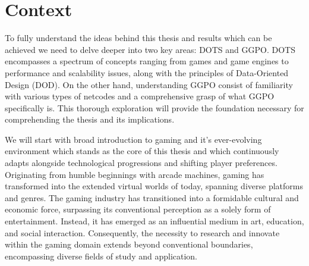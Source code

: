 \chapter{Context}

To fully understand the ideas behind this thesis and results which can be achieved we need to delve deeper into two key areas: DOTS and GGPO. DOTS encompasses a spectrum of concepts ranging from games and game engines to performance and scalability issues, along with the principles of Data-Oriented Design (DOD). On the other hand, understanding GGPO consist of familiarity with various types of netcodes and a comprehensive grasp of what GGPO specifically is. This thorough exploration will provide the foundation necessary for comprehending the thesis and its implications.\newline

We will start with broad introduction to gaming and it's ever-evolving environment which stands as the core of this thesis and which continuously adapts alongside technological progressions and shifting player preferences. Originating from humble beginnings with arcade machines, gaming has transformed into the extended virtual worlds of today, spanning diverse platforms and genres. The gaming industry has transitioned into a formidable cultural and economic force, surpassing its conventional perception as a solely form of entertainment. Instead, it has emerged as an influential medium in art, education, and social interaction. Consequently, the necessity to research and innovate within the gaming domain extends beyond conventional boundaries, encompassing diverse fields of study and application.\newline

